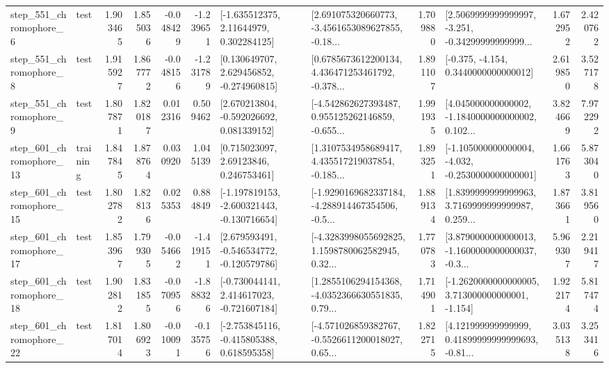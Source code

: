 \begin{tabular}{llrrrrllrlrr}
   step\_551\_chromophore\_6 &      test &      1.903465 &    1.855036 &     -0.048429 & -1.239651 &     [-1.635512375, 2.11644979, 0.302284125] &  [2.691075320660773, -3.4561653089627855, -0.18... &       1.709880 &  [2.5069999999999997, -3.251, -0.34299999999999... &            1.672952 &          2.420762 \\
   step\_551\_chromophore\_8 &      test &      1.915927 &    1.867772 &     -0.048156 & -1.231789 &    [0.130649707, 2.629456852, -0.274960815] &  [0.6785673612200134, 4.436471253461792, -0.378... &       1.891107 &               [-0.375, -4.154, 0.3440000000000012] &            2.619850 &          3.527178 \\
   step\_551\_chromophore\_9 &      test &      1.807871 &    1.820187 &      0.012316 &  0.509462 &    [2.670213804, -0.592026692, 0.081339152] &  [-4.542862627393487, 0.955125262146859, -0.655... &       1.991935 &  [4.045000000000002, -1.1840000000000002, 0.102... &            3.824669 &          7.972292 \\
  step\_601\_chromophore\_13 &  training &      1.847845 &    1.878764 &      0.030920 &  1.045139 &      [0.715023097, 2.69123846, 0.246753461] &  [1.3107534958689417, 4.435517219037854, -0.185... &       1.893251 &  [-1.105000000000004, -4.032, -0.2530000000000001] &            1.661763 &          5.873040 \\
  step\_601\_chromophore\_15 &      test &      1.802782 &    1.828136 &      0.025353 &  0.884849 &  [-1.197819153, -2.600321443, -0.130716654] &  [-1.9290169682337184, -4.288914467354506, -0.5... &       1.889134 &  [1.8399999999999963, 3.7169999999999987, 0.259... &            1.873661 &          3.819560 \\
  step\_601\_chromophore\_17 &      test &      1.853967 &    1.799305 &     -0.054662 & -1.419151 &   [2.679593491, -0.546534772, -0.120579786] &  [-4.3283998055692825, 1.1598780062582945, 0.32... &       1.770783 &  [3.8790000000000013, -1.1600000000000037, -0.3... &            5.969307 &          2.219417 \\
  step\_601\_chromophore\_18 &      test &      1.902812 &    1.831855 &     -0.070956 & -1.888326 &   [-0.730044141, 2.414617023, -0.721607184] &  [1.2855106294154368, -4.0352366630551835, 0.79... &       1.714901 &   [-1.2620000000000005, 3.713000000000001, -1.154] &            1.922174 &          5.817474 \\
  step\_601\_chromophore\_22 &      test &      1.817014 &    1.806923 &     -0.010091 & -0.135756 &   [-2.753845116, -0.415805388, 0.618595358] &  [-4.571026859382767, -0.5526611200018027, 0.65... &       1.822715 &  [4.121999999999999, 0.41899999999999693, -0.81... &            3.035138 &          3.253416 \\

\end{tabular}
